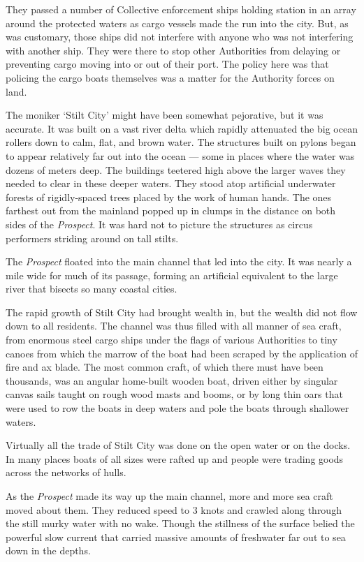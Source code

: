 \documentclass[
]{scrbook}
\begin{document}
They passed a number of Collective enforcement ships holding station in
an array around the protected waters as cargo vessels made the run into
the city. But, as was customary, those ships did not interfere with
anyone who was not interfering with another ship. They were there to
stop other Authorities from delaying or preventing cargo moving into or
out of their port. The policy here was that policing the cargo boats
themselves was a matter for the Authority forces on land.

The moniker `Stilt City' might have been somewhat pejorative, but it was
accurate. It was built on a vast river delta which rapidly attenuated
the big ocean rollers down to calm, flat, and brown water. The
structures built on pylons began to appear relatively far out into the
ocean --- some in places where the water was dozens of meters deep. The
buildings teetered high above the larger waves they needed to clear in
these deeper waters. They stood atop artificial underwater forests of
rigidly-spaced trees placed by the work of human hands. The ones
farthest out from the mainland popped up in clumps in the distance on
both sides of the \emph{Prospect}. It was hard not to picture the
structures as circus performers striding around on tall stilts.

The \emph{Prospect} floated into the main channel that led into the
city. It was nearly a mile wide for much of its passage, forming an
artificial equivalent to the large river that bisects so many coastal
cities.

The rapid growth of Stilt City had brought wealth in, but the wealth did
not flow down to all residents. The channel was thus filled with all
manner of sea craft, from enormous steel cargo ships under the flags of
various Authorities to tiny canoes from which the marrow of the boat had
been scraped by the application of fire and ax blade. The most common
craft, of which there must have been thousands, was an angular
home-built wooden boat, driven either by singular canvas sails taught on
rough wood masts and booms, or by long thin oars that were used to row
the boats in deep waters and pole the boats through shallower waters.

Virtually all the trade of Stilt City was done on the open water or on
the docks. In many places boats of all sizes were rafted up and people
were trading goods across the networks of hulls.

As the \emph{Prospect} made its way up the main channel, more and more
sea craft moved about them. They reduced speed to 3 knots and crawled
along through the still murky water with no wake. Though the stillness
of the surface belied the powerful slow current that carried massive
amounts of freshwater far out to sea down in the depths.
\end{document}
